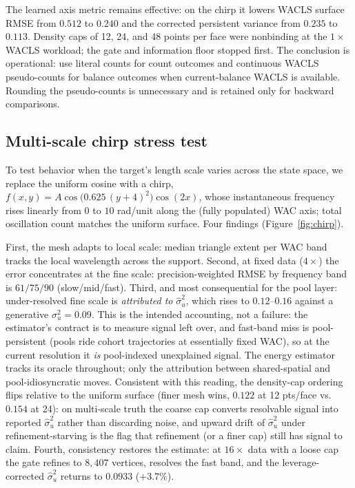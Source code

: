 \documentclass[11pt]{article}
\begin{document}
The learned axis metric remains effective: on the chirp it lowers WACLS surface
RMSE from $0.512$ to $0.240$ and the corrected persistent variance from $0.235$
to $0.113$.  Density caps of 12, 24, and 48 points per face were nonbinding at
the $1\times$ WACLS workload; the gate and information floor stopped first.
The conclusion is operational: use literal counts for count outcomes and
continuous WACLS pseudo-counts for balance outcomes when current-balance WACLS
is available.  Rounding the pseudo-counts is unnecessary and is retained only
for backward comparisons.

\subsection{Multi-scale chirp stress test}\label{sec:chirp}

To test behavior when the target's length scale varies across the state space,
we replace the uniform cosine with a chirp,
$f(x,y)=A\cos\!\big(0.625\,(y+4)^2\big)\cos(2x)$, whose instantaneous frequency
rises linearly from $0$ to $10$ rad/unit along the (fully populated) WAC axis;
total oscillation count matches the uniform surface. Four findings
(Figure~\ref{fig:chirp}).

First, the mesh adapts to local scale: median triangle extent per WAC band
tracks the local wavelength across the support. Second, at fixed data ($4\times$)
the error concentrates at the fine scale: precision-weighted RMSE by frequency
band is $61/75/90$ (slow/mid/fast). Third, and most consequential for the
pool layer: under-resolved fine scale is \emph{attributed to}
$\hat\sigma_u^2$, which rises to $0.12$--$0.16$ against a generative
$\sigma_u^2=0.09$. This is the intended accounting, not a failure: the
estimator's contract is to measure signal left over, and fast-band miss is
pool-persistent (pools ride cohort trajectories at essentially fixed WAC), so
at the current resolution it \emph{is} pool-indexed unexplained signal. The
energy estimator tracks its oracle throughout; only the attribution between
shared-spatial and pool-idiosyncratic moves. Consistent with this reading, the
density-cap ordering flips relative to the uniform surface (finer mesh wins,
$0.122$ at 12 pts/face vs.\ $0.154$ at 24): on multi-scale truth the coarse
cap converts resolvable signal into reported $\hat\sigma_u^2$ rather than
discarding noise, and upward drift of $\hat\sigma_u^2$ under
refinement-starving is the flag that refinement (or a finer cap) still has
signal to claim.
Fourth, consistency restores the estimate: at $16\times$ data with a loose cap
the gate refines to $8{,}407$ vertices, resolves the fast band, and the
leverage-corrected $\hat\sigma_u^2$ returns to $0.0933$ ($+3.7\%$).
\end{document}
